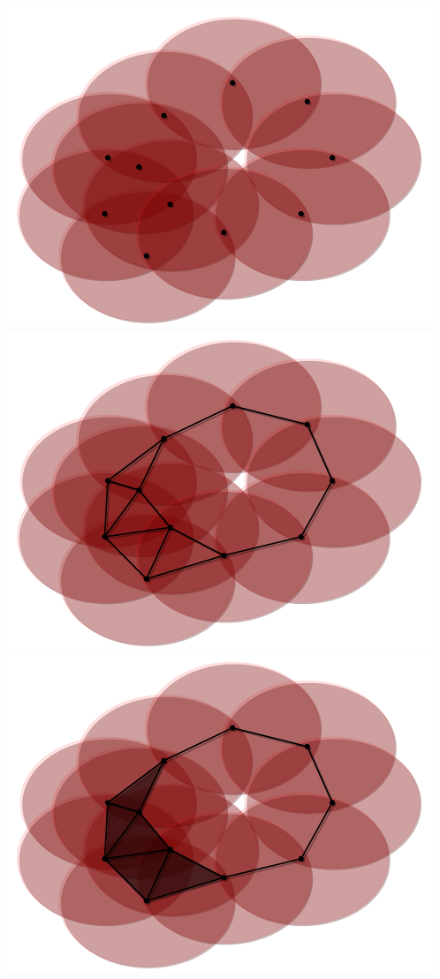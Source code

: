 \begin{figure}[htbp]
\centering
    \includegraphics[scale=0.33]{figures/holes_cover.pdf}
    \includegraphics[scale=0.33]{figures/holes_edges.pdf}
    \includegraphics[scale=0.33]{figures/holes_complex.pdf}

\end{figure}
